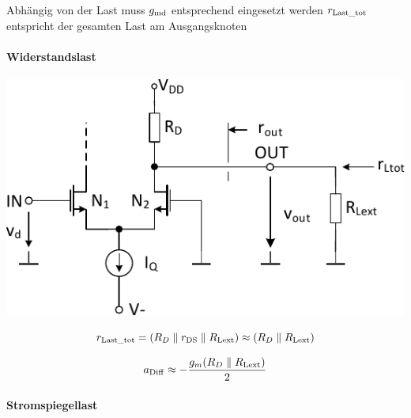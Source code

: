 \begin{outline}
    \1 Abhängig von der Last muss $g_{\rm md}$ entsprechend eingesetzt werden
    \1 $r_{\rm Last\_tot}$ entspricht der gesamten Last am Ausgangsknoten
\end{outline}


\paragraph{Widerstandslast}

\begin{minipage}[t]{0.45\columnwidth}
    \includegraphics[width=\columnwidth, align=t]{images/09_differenzstufe_kleinsignal_verstaerkung_widerstand.pdf}
\end{minipage}
\hfill
\begin{minipage}[t]{0.5\columnwidth}
    \[
        r_{\rm Last\_tot} = \left( R_D \parallel r_{\rm DS} \parallel R_{\rm Lext} \right) \approx \left( R_D \parallel R_{\rm Lext} \right) 
    \]

    \[
        a_{\rm Diff} \approx - \frac{g_m (R_D \parallel R_{\rm Lext})}{2}
    \]
\end{minipage}



\paragraph{Stromspiegellast}

